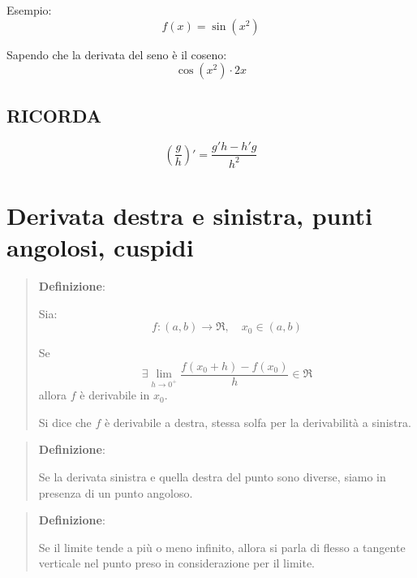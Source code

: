 Esempio:
\begin{equation*}
    f(x) = \sin(x^2)
\end{equation*}

Sapendo che la derivata del seno è il coseno:
\begin{equation*}
    \cos(x^2)\cdot 2x
\end{equation*}

\subsection{RICORDA}
\begin{equation*}
    (\frac{g}{h})' = \frac{g'h - h'g}{h^2}
\end{equation*}

\section{Derivata destra e sinistra, punti angolosi, cuspidi}

\begin{quote}
    \textbf{Definizione}:


Sia:
\begin{equation*}
    f:(a,b) \rightarrow \Re, \quad x_0 \in (a,b)
\end{equation*}

Se 
\begin{equation*}
    \exists \lim_{h \rightarrow 0^+} \frac{f(x_0 + h) - f(x_0)}{h} \in \Re
\end{equation*}
allora $f$ è derivabile in $x_0$.


Si dice che $f$ è derivabile a destra, stessa solfa per la derivabilità a sinistra.

\end{quote}

\begin{quote}
    \textbf{Definizione}:

    Se la derivata sinistra e quella destra del punto sono diverse, siamo in presenza di un punto angoloso.
        
\end{quote}

\begin{quote}
    

    \textbf{Definizione}:

    Se il limite tende a più o meno infinito, allora si parla di flesso a tangente verticale nel punto preso in considerazione per il limite.

\end{quote}

